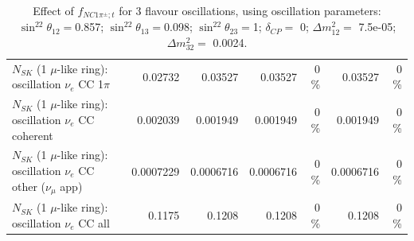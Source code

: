 \begin{table}
\begin{tabular}{| l | r | r | r  r | r  r |}
                     $N_{SK}$ (1 $\mu$-like ring): oscillation $\nu_e$ CC 1$\pi$ &         0.02732 &         0.03527 &         0.03527 &        0 \%  &         0.03527 &        0 \%  \\ 
                   $N_{SK}$ (1 $\mu$-like ring): oscillation $\nu_e$ CC coherent &        0.002039 &        0.001949 &        0.001949 &        0 \%  &        0.001949 &        0 \%  \\ 
      $N_{SK}$ (1 $\mu$-like ring): oscillation $\nu_e$ CC other ($\nu_\mu$ app) &       0.0007229 &       0.0006716 &       0.0006716 &        0 \%  &       0.0006716 &        0 \%  \\ 
                       $N_{SK}$ (1 $\mu$-like ring): oscillation $\nu_e$  CC all &          0.1175 &          0.1208 &          0.1208 &        0 \%  &          0.1208 &        0 \%  \\ 
\hline
\hline
\end{tabular}
\caption{ Effect of $f_{NC1\pi^\pm; t}$ for 3 flavour oscillations, using oscillation parameters:  $\sin^22\theta_{12} = $0.857; $\sin^22\theta_{13} = $0.098; $\sin^22\theta_{23} = $1; $\delta_{CP} = $        0; $\Delta m^2_{12} = $    7.5e-05; $\Delta m^2_{32} = $    0.0024. }
\label{tab:num_xsec_norm_nc1piC_1RmuT_3f_osc_t13:0.098}
\end{table}
\clearpage
